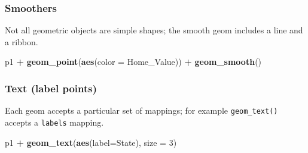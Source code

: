 \documentclass[]{book}
\newenvironment{Shaded}{\begin{snugshade}}{\end{snugshade}}
\newcommand{\KeywordTok}[1]{\textcolor[rgb]{0.13,0.29,0.53}{\textbf{#1}}}
\newcommand{\DataTypeTok}[1]{\textcolor[rgb]{0.13,0.29,0.53}{#1}}
\newcommand{\DecValTok}[1]{\textcolor[rgb]{0.00,0.00,0.81}{#1}}
\newcommand{\StringTok}[1]{\textcolor[rgb]{0.31,0.60,0.02}{#1}}
\newcommand{\OperatorTok}[1]{\textcolor[rgb]{0.81,0.36,0.00}{\textbf{#1}}}
\newcommand{\NormalTok}[1]{#1}
\begin{document}
\begin{Shaded}
\end{Shaded}

\subsubsection{Smoothers}\label{smoothers}

Not all geometric objects are simple shapes; the smooth geom includes a
line and a ribbon.

\begin{Shaded}
\begin{Highlighting}[]
\NormalTok{p1 }\OperatorTok{+}
\StringTok{  }\KeywordTok{geom_point}\NormalTok{(}\KeywordTok{aes}\NormalTok{(}\DataTypeTok{color =}\NormalTok{ Home_Value)) }\OperatorTok{+}
\StringTok{  }\KeywordTok{geom_smooth}\NormalTok{()}
\end{Highlighting}
\end{Shaded}

\subsubsection{Text (label points)}\label{text-label-points}

Each geom accepts a particular set of mappings; for example
\texttt{geom\_text()} accepts a \texttt{labels} mapping.

\begin{Shaded}
\begin{Highlighting}[]
\NormalTok{p1 }\OperatorTok{+}\StringTok{ }
\StringTok{  }\KeywordTok{geom_text}\NormalTok{(}\KeywordTok{aes}\NormalTok{(}\DataTypeTok{label=}\NormalTok{State), }\DataTypeTok{size =} \DecValTok{3}\NormalTok{)}
\end{Highlighting}
\end{Shaded}
\end{document}

